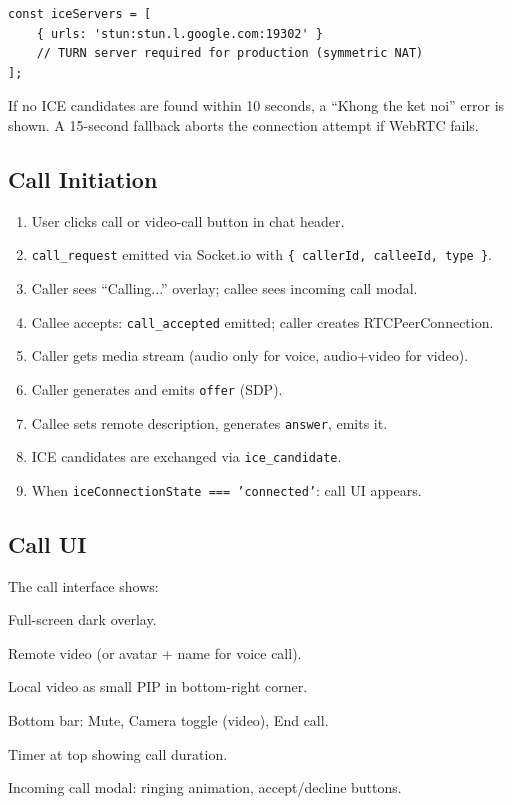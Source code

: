 \documentclass[12pt,a4paper]{article}
\newcommand{\code}[1]{\texttt{#1}}
\begin{document}
\begin{lstlisting}[style=js]
const iceServers = [
    { urls: 'stun:stun.l.google.com:19302' }
    // TURN server required for production (symmetric NAT)
];
\end{lstlisting}

If no ICE candidates are found within 10 seconds,
a ``Khong the ket noi'' error is shown. A 15-second fallback
aborts the connection attempt if WebRTC fails.

\subsection{Call Initiation}
\label{sec:call-init}

\begin{enumerate}
    \item User clicks call or video-call button in chat header.
    \item \code{call\_request} emitted via Socket.io with \code{\{ callerId, calleeId, type \}}.
    \item Caller sees ``Calling...'' overlay; callee sees incoming call modal.
    \item Callee accepts: \code{call\_accepted} emitted; caller creates RTCPeerConnection.
    \item Caller gets media stream (audio only for voice, audio+video for video).
    \item Caller generates and emits \code{offer} (SDP).
    \item Callee sets remote description, generates \code{answer}, emits it.
    \item ICE candidates are exchanged via \code{ice\_candidate}.
    \item When \code{iceConnectionState === 'connected'}: call UI appears.
\end{enumerate}

\subsection{Call UI}
\label{sec:call-ui}

The call interface shows:
\begin{compactitem}
    \item Full-screen dark overlay.
    \item Remote video (or avatar + name for voice call).
    \item Local video as small PIP in bottom-right corner.
    \item Bottom bar: Mute, Camera toggle (video), End call.
    \item Timer at top showing call duration.
    \item Incoming call modal: ringing animation, accept/decline buttons.
\end{compactitem}
\end{document}
